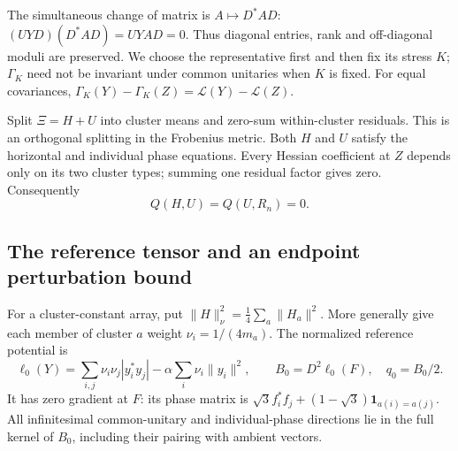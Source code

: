 The simultaneous change of matrix is $A\mapsto D^*AD$:
$(UYD)(D^*AD)=UYA D=0$. Thus diagonal entries, rank and off-diagonal
moduli are preserved. We choose the representative first and then fix
its stress $K$; $\Gamma_K$ need not be invariant under common unitaries
when $K$ is fixed.
For equal covariances,
$\Gamma_K(Y)-\Gamma_K(Z)=\mathcal L(Y)-\mathcal L(Z)$.

Split $\Xi=H+U$ into cluster means and zero-sum within-cluster residuals.
This is an orthogonal splitting in the Frobenius metric.
Both $H$ and $U$ satisfy the horizontal and individual phase equations.
Every Hessian coefficient at $Z$ depends only on its two cluster types;
summing one residual factor gives zero. Consequently
\begin{equation}\label{app:local:split}
 Q(H,U)=Q(U,R_n)=0 .
\end{equation}

\subsection{The reference tensor and an endpoint perturbation bound}
\label{app:local:reference}

For a cluster-constant array, put
$\|H\|_\nu^2=\frac14\sum_a\|H_a\|^2$. More generally give each member
of cluster $a$ weight $\nu_i=1/(4m_a)$.
The normalized reference potential is
\[
 \ell_0(Y)=\sum_{i,j}\nu_i\nu_j|y_i^*y_j|
                  -\alpha\sum_i\nu_i\|y_i\|^2,\qquad
 B_0=D^2\ell_0(F),\quad q_0=B_0/2 .
\]
It has zero gradient at $F$: its phase matrix is
$\sqrt3 f_i^*f_j+(1-\sqrt3)\mathbf1_{a(i)=a(j)}$.
All infinitesimal common-unitary and individual-phase directions lie
in the full kernel of $B_0$, including their pairing with ambient vectors.

